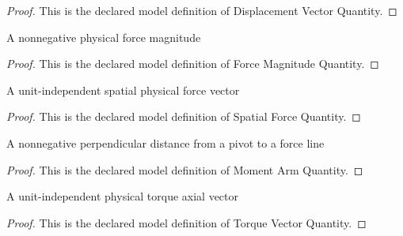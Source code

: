 \begin{proof}
  This is the declared model definition of Displacement Vector Quantity.
\end{proof}
\begin{definition}
  \label{def:physics:phyx-mini-0701:phyxminiproblems-problemphyxmini0701-forcemagnitudequantity}
  A nonnegative physical force magnitude
\end{definition}
\begin{proof}
  This is the declared model definition of Force Magnitude Quantity.
\end{proof}
\begin{definition}
  \label{def:physics:phyx-mini-0701:phyxminiproblems-problemphyxmini0701-spatialforcequantity}
  A unit-independent spatial physical force vector
\end{definition}
\begin{proof}
  This is the declared model definition of Spatial Force Quantity.
\end{proof}
\begin{definition}
  \label{def:physics:phyx-mini-0701:phyxminiproblems-problemphyxmini0701-momentarmquantity}
  A nonnegative perpendicular distance from a pivot to a force line
\end{definition}
\begin{proof}
  This is the declared model definition of Moment Arm Quantity.
\end{proof}
\begin{definition}
  \label{def:physics:phyx-mini-0701:phyxminiproblems-problemphyxmini0701-torquevectorquantity}
  A unit-independent physical torque axial vector
\end{definition}
\begin{proof}
  This is the declared model definition of Torque Vector Quantity.
\end{proof}
